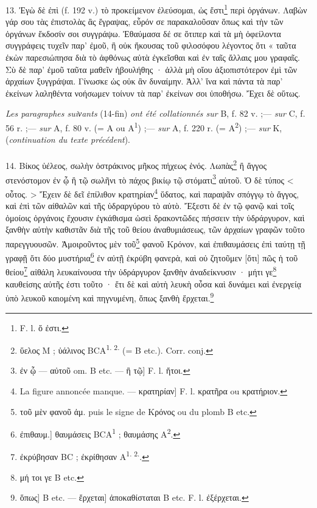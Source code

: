 \documentclass[landscape, a4paper, 11pt, oneside, polutonikogreek, french]{article}
\begin{document}
13. Ἐγὼ δὲ ἐπὶ (f. 192 v.) τὸ προκείμενον ἐλεύσομαι, ὡς ἔστι\footnote{F. l. ὅ ἐστι.} περὶ ὀργάνων. Λαβὼν γάρ σου τὰς ἐπιστολὰς ἃς ἔγραψας, εὗρόν σε παρακαλοῦσαν ὅπως καὶ τὴν τῶν ὀργάνων ἔκδοσίν σοι συγγράψω. Ἐθαύμασα δέ σε ὅτιπερ καὶ τὰ μὴ ὀφείλοντα συγγράφεις τυχεῖν παρ' ἐμοῦ, ἢ οὐκ ἤκουσας τοῦ φιλοσόφου λέγοντος ὅτι « ταῦτα ἐκὼν παρεσιώπησα διὰ τὸ ἀφθόνως αὐτὰ ἐγκεῖσθαι καὶ ἐν ταῖς ἄλλαις μου γραφαῖς. Σὺ δὲ παρ' ἐμοῦ ταῦτα μαθεῖν ἠβουλήθης · ἀλλὰ μὴ οἴου ἀξιοπιστότερον ἐμὶ τῶν ἀρχαίων ξυγγράψαι. Γίνωσκε ὡς οὐκ ἂν δυναίμην. Ἀλλ' ἵνα καὶ πάντα τὰ παρ' ἐκείνων λαληθέντα νοήσωμεν τοίνυν τὰ παρ' ἐκείνων σοι ὑποθήσω. Ἔχει δὲ οὕτως.
\begin{center}
\emph{Les paragraphes suiνants} (14-fin) \emph{ont été collationnés sur} B, f. 82 v. ;--- \emph{sur} C, f. 56 r. ;--- \emph{sur} A, f. 80 v. (= A ou A\textsuperscript{1}) ;--- \emph{sur} A, f. 220 r. (= A\textsuperscript{2}) ;--- \emph{sur} K, (\emph{continuation du texte précédent}).
\end{center}
\paragraph{}
14. Βίκος ὑέλεος, σωλὴν ὀστράκινος μῆκος πήχεως ἑνός. Λωπὰς\footnote{ὕελος M ; ὑάλινος BCA\textsuperscript{1. 2.} (= B etc.). Corr. conj.} ἢ ἄγγος στενόστομον ἐν ᾧ ἢ τῷ σωλῆνι τὸ πάχος βικίῳ τῷ στόματι\footnote{ἐν ᾧ --- αὐτοῦ om. B etc. --- ἢ τῷ] F. l. ἤτοι.} αὐτοῦ. Ὁ δὲ τύπος < οὗτος. > Ἔχειν δὲ δεῖ ἐπίλιθον κρατηρίαν\footnote{La figure annoncée manque. --- κρατηρίαν] F. l. κρατῆρα ou κρατήριον.} ὕδατος, καὶ παραψᾶν σπόγγῳ τὸ ἄγγος, καὶ ἐπὶ τῶν αἰθαλῶν καὶ τῆς ὑδραργύρου τὸ αὐτὸ. Ἔξεστι δὲ ἐν τῷ φανῷ καὶ τοῖς ὁμοίοις ὀργάνοις ἔχουσιν ἐγκάθισμα ὡσεὶ δρακοντῶδες πήσσειν τὴν ὑδράργυρον, καὶ ξανθὴν αὐτὴν καθιστᾶν διὰ τῆς τοῦ θείου ἀναθυμιάσεως, τῶν ἀρχαίων γραφῶν τοῦτο παρεγγυουσῶν. Ἀμοιροῦντος μὲν τοῦ\footnote{τοῦ μὲν φανοῦ ἀμ. puis le signe de Κρόνος ou du plomb B etc.} φανοῦ Κρόνον, καὶ ἐπιθαυμάσεις ἐπὶ ταύτῃ τῇ γραφῇ ὅτι δύο μυστήρια\footnote{ἐπιθαυμ.] θαυμάσεις BCA\textsuperscript{1} ; θαυμάσης A\textsuperscript{2}.} ἐν αὐτῇ ἐκρύβη φανερὰ, καὶ οὐ ζητοῦμεν [ὅτι] πῶς ἡ τοῦ θείου\footnote{ἐκρύβησαν BC ; ἐκρίθησαν A\textsuperscript{1. 2.}.} αἰθάλη λευκαίνουσα τὴν ὑδράργυρον ξανθὴν ἀναδείκνυσιν · μήτι γε\footnote{μή τοι γε B etc.} καυθείσης αὐτῆς ἐστι τοῦτο · ἔτι δὲ καὶ αὐτὴ λευκὴ οὖσα καὶ δυνάμει καὶ ἐνεργείᾳ ὑπὸ λευκοῦ καιομένη καὶ πηγνυμένη, ὅπως ξανθὴ ἔρχεται.\footnote{ὅπως] B etc. --- ἔρχεται] ἀποκαθίσταται B etc. F. l. ἐξέρχεται.}
\end{document}
